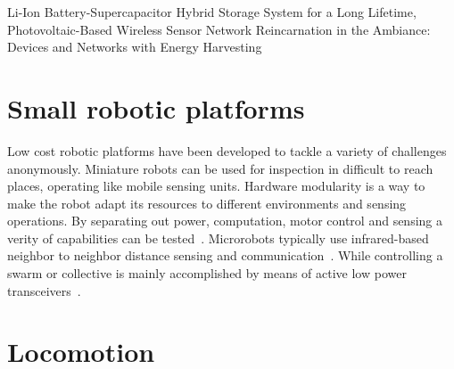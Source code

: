 Li-Ion Battery-Supercapacitor Hybrid Storage System for a Long Lifetime, Photovoltaic-Based Wireless Sensor Network	\cite{ongaro_pwre_2012}
Reincarnation in the Ambiance: Devices and Networks with Energy Harvesting \cite{prasad_comst_2014}



\section{Small robotic platforms}

% 

Low cost robotic platforms have been developed to tackle a variety of challenges anonymously.
Miniature robots can be used for inspection in difficult to reach places, operating like mobile sensing units.
Hardware modularity is a way to make the robot adapt its resources to different environments and sensing operations.
By separating out power, computation, motor control and sensing a verity of capabilities can be tested~\cite{sabelhaus_icra_2013, pickem_icra_2015, kim_iros_2016}.
Microrobots typically use infrared-based neighbor to neighbor distance sensing and communication~\cite{rubenstein_icra_2012, pickem_icra_2015, kim_iros_2016}.
While controlling a swarm or collective is mainly accomplished by means of active low power transceivers~\cite{sabelhaus_icra_2013, pickem_icra_2015, kim_iros_2016}. 


\section{Locomotion}

